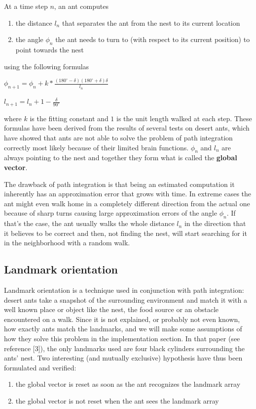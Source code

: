 \documentclass[11pt]{article}
\begin{document}
At a time step $n$, an ant computes
\begin{enumerate}
\item the distance $l_n$ that separates the ant from the nest to its current location
\item the angle $\phi_n$ the ant needs to turn to (with respect to its current position) to point towards the nest
\end{enumerate}

using the following formulas

\begin{center}
$\phi_{n+1} = \phi_n + k*\frac{(180^{\circ} - \delta)(180^{\circ} + \delta) \delta}{l_n}$
\end{center}
\begin{center}
$l_{n+1} = l_n + 1 - \frac{\delta}{90^{\circ}}$
\end{center}

where $k$ is the fitting constant and $1$ is the unit length walked at each step. These formulas have been derived from the results of several tests on desert ants, which have showed that ants are not able to solve the problem of path integration correctly most likely because of their limited brain functions. $\phi_n$ and $l_n$ are always pointing to the nest and together they form what is called the \textbf{global vector}.

The drawback of path integration is that being an estimated computation it inherently has an approximation error that grows with time. In extreme cases the ant might even walk home in a completely different direction from the actual one because of sharp turns causing large approximation errors of the angle $\phi_n$. If that's the case, the ant usually walks the whole distance $l_n$ in the direction that it believes to be correct and then, not finding the nest, will start searching for it in the neighborhood with a random walk.

\subsection{Landmark orientation}

Landmark orientation is a technique used in conjunction with path integration: desert ants take a snapshot of the surrounding environment and match it with a well known place or object like the nest, the food source or an obstacle encountered on a walk. Since it is not explained, or probably not even known, how exactly ants match the landmarks, and we will make some assumptions of how they solve this problem in the implementation section. In that paper (see reference [3]), the only landmarks used are four black cylinders surrounding the ants' nest. Two interesting (and mutually exclusive) hypothesis have thus been formulated and verified:
\begin{enumerate}
\item the global vector is reset as soon as the ant recognizes the landmark array
\item the global vector is not reset when the ant sees the landmark array
\end{enumerate}
\end{document}
